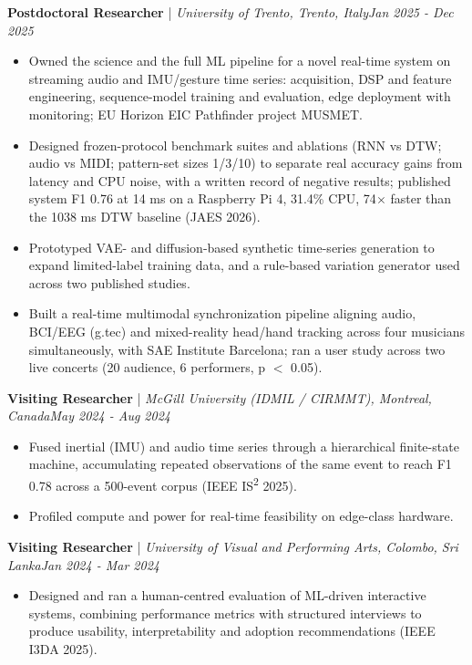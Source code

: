 \documentclass[11pt]{article}
\newenvironment{cvrole}[5]{%
  \par\noindent\textbf{\large #1} | \textit{\small #2, #3}\hfill \textit{\small #4 - #5}\par
  \begin{itemize}[leftmargin=2em, itemsep=-0.3em, topsep=-0.5em]%
}{%
  \end{itemize}\par\noindent\mbox{}\par\vspace{0.1em}%
}
\begin{document}
\begin{cvrole}{Postdoctoral Researcher}{University of Trento}{Trento, Italy}{Jan 2025}{Dec 2025}
    \item Owned the science and the full ML pipeline for a novel real-time system on streaming audio and IMU/gesture time series: acquisition, DSP and feature engineering, sequence-model training and evaluation, edge deployment with monitoring; EU Horizon EIC Pathfinder project MUSMET.
    \item Designed frozen-protocol benchmark suites and ablations (RNN vs DTW; audio vs MIDI; pattern-set sizes 1/3/10) to separate real accuracy gains from latency and CPU noise, with a written record of negative results; published system F1 0.76 at 14 ms on a Raspberry Pi 4, 31.4\% CPU, 74$\times$ faster than the 1038 ms DTW baseline (JAES 2026).
    \item Prototyped VAE- and diffusion-based synthetic time-series generation to expand limited-label training data, and a rule-based variation generator used across two published studies.
    \item Built a real-time multimodal synchronization pipeline aligning audio, BCI/EEG (g.tec) and mixed-reality head/hand tracking across four musicians simultaneously, with SAE Institute Barcelona; ran a user study across two live concerts (20 audience, 6 performers, p $<$ 0.05).
\end{cvrole}

\begin{cvrole}{Visiting Researcher}{McGill University (IDMIL / CIRMMT)}{Montreal, Canada}{May 2024}{Aug 2024}
    \item Fused inertial (IMU) and audio time series through a hierarchical finite-state machine, accumulating repeated observations of the same event to reach F1 0.78 across a 500-event corpus (IEEE IS\textsuperscript{2} 2025).
    \item Profiled compute and power for real-time feasibility on edge-class hardware.
\end{cvrole}

\begin{cvrole}{Visiting Researcher}{University of Visual and Performing Arts}{Colombo, Sri Lanka}{Jan 2024}{Mar 2024}
    \item Designed and ran a human-centred evaluation of ML-driven interactive systems, combining performance metrics with structured interviews to produce usability, interpretability and adoption recommendations (IEEE I3DA 2025).
\end{cvrole}
\end{document}

